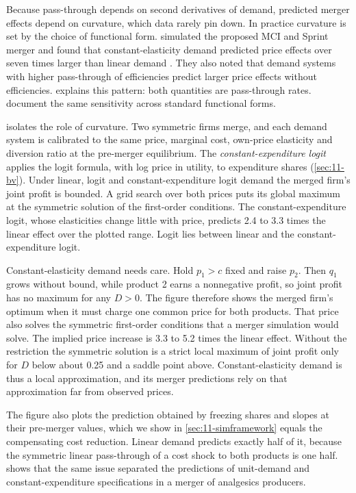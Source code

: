  Because pass-through depends on second derivatives of demand, predicted merger
effects depend on curvature, which data rarely pin down. In practice curvature is set by the choice of functional
form. \citet{FroebTschantzWerden2005} simulated the proposed MCI and Sprint merger and found that constant-elasticity
demand predicted price effects over seven times larger than linear demand \citep[p.~19]{FarrellShapiro2010}. They also
noted that demand systems with higher pass-through of efficiencies predict larger price effects without efficiencies.
 explains this pattern: both quantities are pass-through rates. \citet{CrookeEtAl1999} document the
same sensitivity across standard functional forms.

 isolates the role of curvature. Two symmetric firms merge, and each demand system is calibrated
to the same price, marginal cost, own-price elasticity and diversion ratio at the pre-merger equilibrium. The
\emph{constant-expenditure logit} applies the logit formula, with log price in utility, to expenditure shares
(\cref{sec:11-bv}). Under linear, logit and constant-expenditure logit demand the merged firm's joint profit is
bounded. A grid search over both prices puts its global maximum at the symmetric solution of the first-order
conditions. The constant-expenditure logit, whose elasticities change little with price, predicts 2.4 to 3.3 times
the linear effect over the plotted range. Logit lies between linear and the constant-expenditure logit.

Constant-elasticity demand needs care. Hold $p_1 > c$ fixed and raise $p_2$. Then $q_1$ grows without bound, while
product 2 earns a nonnegative profit, so joint profit has no maximum for any $D > 0$. The figure therefore shows the
merged firm's optimum when it must charge one common price for both products. That price also solves the symmetric
first-order conditions that a merger simulation would solve. The implied price increase is 3.3 to 5.2 times the
linear effect. Without the restriction the symmetric solution is a strict local maximum of joint profit only for $D$
below about 0.25 and a saddle point above. Constant-elasticity demand is thus a local approximation, and its merger
predictions rely on that approximation far from observed prices.

The figure also plots the prediction obtained by freezing shares and slopes at their
pre-merger values, which we show in \cref{sec:11-simframework} equals the compensating cost reduction. Linear demand
predicts exactly half of it, because the symmetric linear pass-through of a cost shock to both products is one half.
 shows that the same issue separated the predictions of unit-demand and constant-expenditure
specifications in a merger of analgesics producers.

